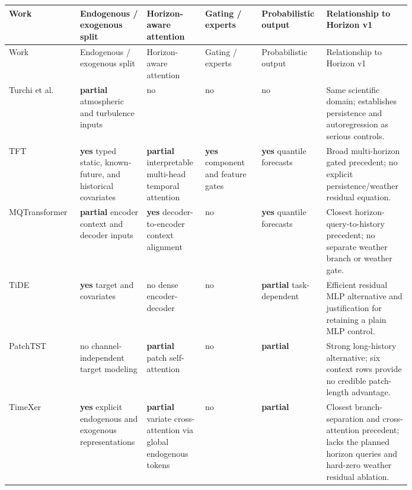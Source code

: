 \documentclass[10pt]{article}
\newcommand{\yes}{\textcolor{stratateal}{\textbf{yes}}}
\newcommand{\partialmatch}{\textcolor{strataamber}{\textbf{partial}}}
\newcommand{\no}{\textcolor{stratagray}{no}}
\begin{document}
\scriptsize
\setlength{\tabcolsep}{3pt}
\begin{longtable}{>{\raggedright\arraybackslash}p{0.14\linewidth}
                  >{\raggedright\arraybackslash}p{0.12\linewidth}
                  >{\raggedright\arraybackslash}p{0.12\linewidth}
                  >{\raggedright\arraybackslash}p{0.13\linewidth}
                  >{\raggedright\arraybackslash}p{0.12\linewidth}
                  >{\raggedright\arraybackslash}p{0.16\linewidth}}
\toprule
Work & Endogenous / exogenous split & Horizon-aware attention &
Gating / experts & Probabilistic output & Relationship to Horizon v1\\
\midrule
\endfirsthead
\toprule
Work & Endogenous / exogenous split & Horizon-aware attention &
Gating / experts & Probabilistic output & Relationship to Horizon v1\\
\midrule
\endhead
Turchi et al.\ \cite{turchi2022optical}
& \partialmatch{} atmospheric and turbulence inputs
& \no & \no & \no
& Same scientific domain; establishes persistence and autoregression as
serious controls.\\

TFT \cite{lim2020tft}
& \yes{} typed static, known-future, and historical covariates
& \partialmatch{} interpretable multi-head temporal attention
& \yes{} component and feature gates
& \yes{} quantile forecasts
& Broad multi-horizon gated precedent; no explicit persistence/weather
residual equation.\\

MQTransformer \cite{eisenach2022mqtransformer}
& \partialmatch{} encoder context and decoder inputs
& \yes{} decoder-to-encoder context alignment
& \no & \yes{} quantile forecasts
& Closest horizon-query-to-history precedent; no separate weather branch or
weather gate.\\

TiDE \cite{das2024tide}
& \yes{} target and covariates
& \no{} dense encoder-decoder
& \no & \partialmatch{} task-dependent
& Efficient residual MLP alternative and justification for retaining a plain
MLP control.\\

PatchTST \cite{nie2023patchtst}
& \no{} channel-independent target modeling
& \partialmatch{} patch self-attention
& \no & \partialmatch{}
& Strong long-history alternative; six context rows provide no credible
patch-length advantage.\\

TimeXer \cite{wang2024timexer}
& \yes{} explicit endogenous and exogenous representations
& \partialmatch{} variate cross-attention via global endogenous tokens
& \no & \partialmatch{}
& Closest branch-separation and cross-attention precedent; lacks the planned
horizon queries and hard-zero weather residual ablation.\\


\end{longtable}
\end{document}
